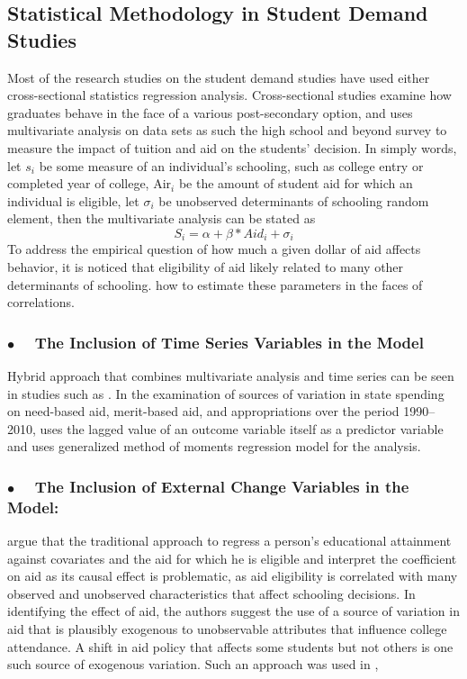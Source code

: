 \documentclass[12pt,english]{report}
\begin{document}
\subsection{Statistical Methodology in Student Demand Studies}
Most of the research studies on the student demand studies have used either
cross-sectional statistics regression analysis.  Cross-sectional studies
examine how graduates behave in the face of a various post-secondary option,
and
uses multivariate analysis on data sets as such the high school and beyond
survey to measure the impact of tuition and aid on the students' decision.   
In
simply words, let $s_i$ be some measure of an individual's schooling, such as
college entry or completed year of college, Air$_i$ be the amount of student
aid for which an individual is eligible,  let $\sigma_i$  be unobserved
determinants of schooling  random element, then the multivariate analysis can
be stated as $$S_i = \alpha + \beta * Aid_i + \sigma_i$$
To address the empirical question of how much a given dollar of aid affects
behavior,  it is noticed that eligibility of aid likely related to many other
determinants of schooling.  \cite{Dynarski2002} how to estimate these
parameters in the faces of correlations.

\subsubsection{$\bullet \quad$  The Inclusion of Time Series Variables in the
Model}  Hybrid approach that combines multivariate analysis and time series can
be seen in studies such as \citet{Heller1999}. In the examination of sources of
variation in state spending on need-based aid, merit-based aid, and
appropriations over the period 1990–2010, \citep{McLendon2014} uses the lagged
value of an outcome variable itself as a predictor variable and uses
generalized method of moments regression model for the analysis.

\subsubsection{$\bullet \quad$  The Inclusion of External Change Variables in
the Model:}  \citet{Dynarski2003} argue that the traditional approach to
regress a person's educational attainment against covariates and the aid for
which he is eligible and interpret the coefficient on aid as its causal effect
is problematic, as aid eligibility is correlated with many observed and
unobserved characteristics that affect schooling decisions. In identifying the
effect of aid, the authors suggest the use of a source of variation in aid that
is plausibly exogenous to unobservable attributes that influence college
attendance. A shift in aid policy that affects some students but not others is
one such source of exogenous variation.  Such an approach was used in
\citep{Dynarski2003, Abraham2006},
\end{document}
